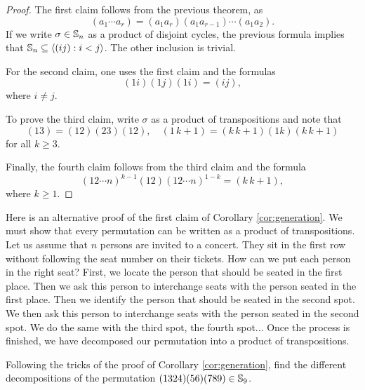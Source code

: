 \begin{proof}
        The first claim follows from the previous theorem, as 
        \[
        (a_1\cdots a_r)=(a_1a_r)(a_1a_{r-1})\cdots(a_1a_2).
        \]
        If we write $\sigma\in\mathbb{S}_n$ as a product of disjoint cycles, 
        the previous formula implies 
        that $\mathbb{S}_n\subseteq\langle (ij):i<j\rangle$. The other 
        inclusion is trivial. 

        For the second claim, one uses the first claim and the
        formulas 
        \[
        (1i)(1j)(1i)=(ij), 
        \]
        where $i\ne j$.

        To prove the third claim, write $\sigma$ as a product 
        of transpositions and 
        note that 
        \[
        (13)=(12)(23)(12),\quad
        (1\,k+1)=(k\,k+1)(1k)(k\,k+1)
        \]
        for all $k\geq3$.

        Finally, the fourth claim follows from 
        the third claim and 
        the formula 
        \[
        (12\cdots n)^{k-1}(12)(12\cdots n)^{1-k}=(k\,k+1),
        \]
        where $k\geq1$.
\end{proof}

Here is an alternative proof of
the first claim of Corollary 
\ref{cor:generation}. We must show that every 
permutation can be written as a product of transpositions. 
Let us assume that $n$ persons are invited to a concert. They sit
in the first row without following  
the seat number on their tickets. How can we put each person in 
the right seat? First, we locate the person that should be seated 
in the first place. Then we ask this person to 
interchange seats with the person seated in the first place. 
Then we identify the person 
that should be seated in the second spot. We then ask this person
to interchange seats with the person 
seated in the second spot. We do the same with the third spot, the fourth
spot... Once the process is finished, 
we have decomposed 
our permutation into a product of transpositions. 

\begin{exercise}
    Following the tricks of the proof of 
    Corollary \ref{cor:generation}, find the different
    decompositions of the permutation
    $(1324)(56)(789)\in\mathbb{S}_9$. 
\end{exercise}

